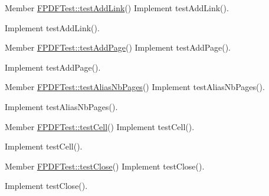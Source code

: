 \label{todo__todo000182}
\hypertarget{todo__todo000182}{}
 
\begin{DoxyDescription}
\item[Member \hyperlink{class_f_p_d_f_test_a1895a422f29864b8ed7323e150ed15ee}{FPDFTest::testAddLink}() ]Implement testAddLink().

Implement testAddLink().
\end{DoxyDescription}

\label{todo__todo000168}
\hypertarget{todo__todo000168}{}
 
\begin{DoxyDescription}
\item[Member \hyperlink{class_f_p_d_f_test_a2d6010027612171bc7a537a60f4faa85}{FPDFTest::testAddPage}() ]Implement testAddPage().

Implement testAddPage().
\end{DoxyDescription}

\label{todo__todo000164}
\hypertarget{todo__todo000164}{}
 
\begin{DoxyDescription}
\item[Member \hyperlink{class_f_p_d_f_test_a6ee64c62a92b0448d22a55994bd1a3cd}{FPDFTest::testAliasNbPages}() ]Implement testAliasNbPages().

Implement testAliasNbPages().
\end{DoxyDescription}

\label{todo__todo000187}
\hypertarget{todo__todo000187}{}
 
\begin{DoxyDescription}
\item[Member \hyperlink{class_f_p_d_f_test_af8b8cbe99bd1f70247bcac12267a7356}{FPDFTest::testCell}() ]Implement testCell().

Implement testCell().
\end{DoxyDescription}

\label{todo__todo000167}
\hypertarget{todo__todo000167}{}
 
\begin{DoxyDescription}
\item[Member \hyperlink{class_f_p_d_f_test_adca50b30895ba89d735672fad56f6b0d}{FPDFTest::testClose}() ]Implement testClose().

Implement testClose().
\end{DoxyDescription}

\label{todo__todo000165}
\hypertarget{todo__todo000165}{}
 
